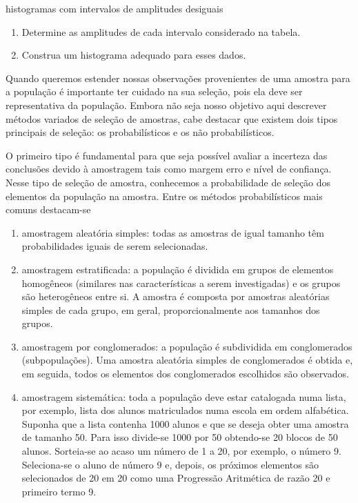 {\begin{task}{histogramas com intervalos de amplitudes desiguais}
\begin{enumerate}
\item {} 
Determine as amplitudes de cada intervalo considerado na tabela.

\item {} 
Construa um histograma adequado para esses dados.

\end{enumerate}
\end{task}


\clearpage
{}
\label{est1-saber-1}

Quando queremos estender nossas observações provenientes de uma amostra para a população é importante ter cuidado na sua seleção, pois ela deve ser representativa da população. Embora não seja nosso objetivo aqui descrever métodos variados de seleção de amostras, cabe destacar que existem dois tipos principais de seleção: os probabilísticos e os não probabilísticos.

O primeiro tipo é fundamental para que seja possível avaliar a incerteza das conclusões devido à amostragem tais como margem erro e nível de confiança.  Nesse tipo de seleção de amostra, conhecemos a probabilidade de seleção dos elementos da população na amostra. Entre os métodos probabilísticos mais comuns destacam-se
\begin{enumerate}
\item {} 
amostragem aleatória simples: todas as amostras de igual tamanho têm probabilidades iguais de serem selecionadas.

\item {} 
amostragem estratificada: a população é dividida em grupos de elementos homogêneos (similares nas características a serem investigadas) e os grupos são heterogêneos entre si. A amostra é composta por amostras aleatórias simples de cada grupo, em geral, proporcionalmente aos tamanhos dos grupos.

\item {} 
amostragem por conglomerados: a população é subdividida em conglomerados (subpopulações). Uma amostra aleatória simples de conglomerados é obtida e, em seguida, todos os elementos dos conglomerados escolhidos são observados.

\item {} 
amostragem sistemática: toda a população deve estar catalogada numa lista, por exemplo, lista dos alunos matriculados numa escola em ordem alfabética. Suponha que a lista contenha 1000 alunos e que se deseja obter uma amostra de tamanho 50. Para isso divide-se 1000 por 50 obtendo-se 20 blocos de 50 alunos. Sorteia-se ao acaso um número de 1 a 20, por exemplo, o número 9. Seleciona-se o aluno de número 9 e, depois, os próximos elementos são selecionados de 20 em 20 como uma Progressão Aritmética de razão 20 e primeiro termo 9.


\end{enumerate}}
